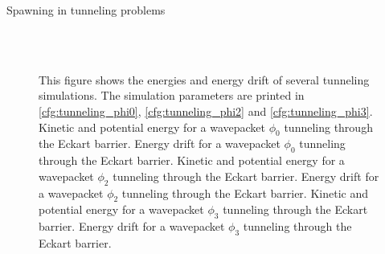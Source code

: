 \begin{chapter}{Spawning in tunneling problems}
\begin{figure}[h!]
{  } \\
   \\
  \caption[Energies and energy drift for some tunneling wavepackets]{
  This figure shows the energies and energy drift of several tunneling simulations.
  The simulation parameters are printed in \ref{cfg:tunneling_phi0}, \ref{cfg:tunneling_phi2} and \ref{cfg:tunneling_phi3}.
   Kinetic and potential energy for a wavepacket $\phi_0$ tunneling through the Eckart barrier.
   Energy drift for a wavepacket $\phi_0$ tunneling through the Eckart barrier.
   Kinetic and potential energy for a wavepacket $\phi_2$ tunneling through the Eckart barrier. 
   Energy drift for a wavepacket $\phi_2$ tunneling through the Eckart barrier.
   Kinetic and potential energy for a wavepacket $\phi_3$ tunneling through the Eckart barrier. 
   Energy drift for a wavepacket $\phi_3$ tunneling through the Eckart barrier.
  \label{fig:tunnel_energies}
  }
\end{figure}


\end{chapter}
